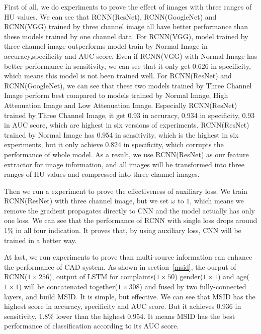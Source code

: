 \documentclass[runningheads]{llncs}
\begin{document}
First of all, we do experiments to prove the effect of images with three ranges of HU values. We can see that RCNN(ResNet), RCNN(GoogleNet) and RCNN(VGG) trained by three channel image all have better performance than these models trained by one channel data. 
For RCNN(VGG), model trained by three channel image outperforms model train by Normal Image in accuracy,specificity and AUC score. Even if RCNN(VGG) with Normal Image has better performance in sensitivity, we can see that it only get 0.626 in specificity, which means this model is not been trained well. For RCNN(ResNet) and RCNN(GoogleNet), we can see that these two models trained by Three Channel Image perform best compared to models trained by Normal Image, High Attenuation Image and Low Attenuation Image. Especially RCNN(ResNet) trained by Three Channel Image, it get 0.93 in accuracy, 0.934 in specificity, 0.93 in AUC score, which are highest in six versions of experiments. RCNN(ResNet) trained by Normal Image has 0.954 in sensitivity, which is the highest in six experiments, but it only achieve 0.824 in specificity, which corrupts the performance of whole model. As a result, we use RCNN(ResNet) as our feature extractor for image information, and all images will be transformed into three ranges of HU values and compressed into three channel images.

Then we run a experiment to prove the effectiveness of auxiliary loss. We train RCNN(ResNet) with three channel image, but we set $\omega$ to $1$, which means we remove the gradient propagates directly to CNN and the model actually has only one loss. We can see that the performance of RCNN with single loss drops around 1\% in all four indication. It proves that, by using auxiliary loss, CNN will be trained in a better way. 

At last, we run experiments to prove than multi-source information can enhance the performance of CAD system. As shown in section~\ref{msid}, the ourput of RCNN($1 \times 256$), output of LSTM for complaints($1 \times 50$) gender($1 \times 1$) and age($1 \times 1$) will be concatenated together($1 \times 308$) and fused by two fully-connected layers, and build MSID. It is simple, but effective. We can see that MSID has the highest score in accuracy, specificity and AUC score. But it achieves 0.936 in sensitivity, 1.8\% lower than the highest 0.954. It means MSID has the best performance of classification according to its AUC score.
\end{document}

